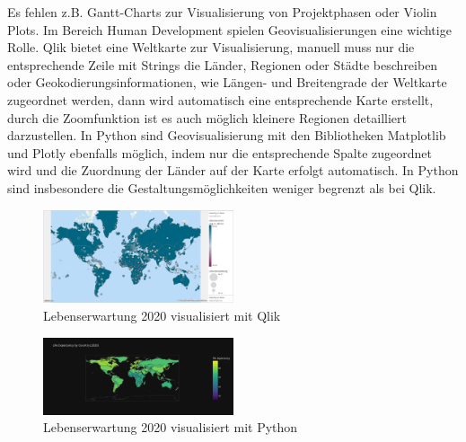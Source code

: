 \documentclass[12pt]{article}
\begin{document}
	Es fehlen z.B. Gantt-Charts zur Visualisierung von Projektphasen oder Violin Plots.
	Im Bereich Human Development spielen Geovisualisierungen eine wichtige Rolle. Qlik bietet eine Weltkarte zur Visualisierung, manuell muss nur die entsprechende Zeile mit Strings die Länder, Regionen oder Städte beschreiben oder Geokodierungsinformationen, wie Längen- und Breitengrade der Weltkarte zugeordnet werden, dann wird automatisch eine entsprechende Karte erstellt, durch die Zoomfunktion ist es auch möglich kleinere Regionen detailliert darzustellen. In Python sind Geovisualisierung mit den Bibliotheken Matplotlib und Plotly ebenfalls möglich, indem nur die entsprechende Spalte zugeordnet wird und die Zuordnung der Länder auf der Karte erfolgt automatisch. In Python sind insbesondere die Gestaltungsmöglichkeiten weniger begrenzt als bei Qlik.
	\begin{figure}[h]
		\centering
		\includegraphics[width=0.5\textwidth]{life_exp_qlik}
		\caption{Lebenserwartung 2020 visualisiert mit Qlik}
	\end{figure}
	\begin{figure}[h]
		\centering
		\includegraphics[width=0.5\textwidth]{life_exp_python}
		\caption{Lebenserwartung 2020 visualisiert mit Python}
	\end{figure}
	
\end{document}

